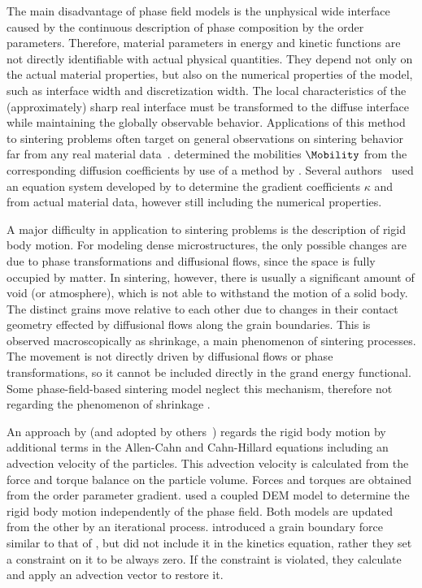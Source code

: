 The main disadvantage of phase field models is the unphysical wide interface caused by the continuous description of phase composition by the order parameters.
Therefore, material parameters in energy and kinetic functions are not directly identifiable with actual physical quantities.
They depend not only on the actual material properties, but also on the numerical properties of the model, such as interface width and discretization width.
The local characteristics of the (approximately) sharp real interface must be transformed to the diffuse interface while maintaining the globally observable behavior.
Applications of this method to sintering problems often target on general observations on sintering behavior far from any real material data~\cite{Deng2012, Wang2006, Asp2006, Jing2003, Kumar2010, Kumar2011, Shinagawa2014}.
\textcite{Biswas2016, Biswas2017} determined the mobilities $\Mobility$ from the corresponding diffusion coefficients by use of a method by \textcite{Moelans2008}.
Several authors~\cite{Chockalingam2016, Biswas2016, Biswas2017, Choudhuri2021} used an equation system developed by \textcite{Ahmed2013} to determine the gradient coefficients $\kappa$ and from actual material data, however still including the numerical properties.

A major difficulty in application to sintering problems is the description of rigid body motion.
For modeling dense microstructures, the only possible changes are due to phase transformations and diffusional flows, since the space is fully occupied by matter.
In sintering, however, there is usually a significant amount of void (or atmosphere), which is not able to withstand the motion of a solid body.
The distinct grains move relative to each other due to changes in their contact geometry effected by diffusional flows along the grain boundaries.
This is observed macroscopically as shrinkage, a main phenomenon of sintering processes.
The movement is not directly driven by diffusional flows or phase transformations, so it cannot be included directly in the grand energy functional.
Some phase-field-based sintering model neglect this mechanism, therefore not regarding the phenomenon of shrinkage \cite{Asp2006, Chockalingam2016, Hotzer2019, Jing2003, Kumar2010, Kumar2011, Deng2012, Zhang2014, Yang2020, Choudhuri2021}.

An approach by \textcite{Wang2006} (and adopted by others~\cite{Termuhlen2021, Biswas2016, Biswas2017}) regards the rigid body motion by additional terms in the Allen-Cahn and Cahn-Hillard equations including an advection velocity of the particles.
This advection velocity is calculated from the force and torque balance on the particle volume.
Forces and torques are obtained from the order parameter gradient.
\textcite{Shinagawa2014} used a coupled \gls{DEM} model to determine the rigid body motion independently of the phase field.
Both models are updated from the other by an iterational process.
\textcite{Ivannikov2021} introduced a grain boundary force similar to that of \textcite{Wang2006}, but did not include it in the kinetics equation, rather they set a constraint on it to be always zero.
If the constraint is violated, they calculate and apply an advection vector to restore it.

